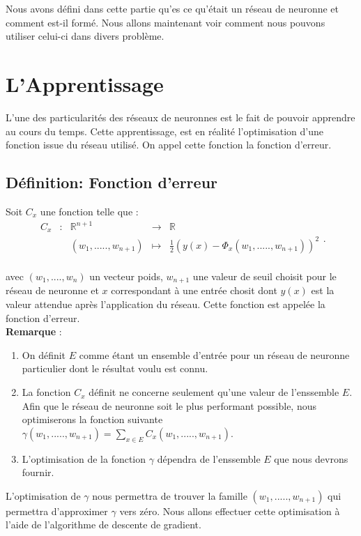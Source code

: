 \documentclass{article}
\newcommand{\fonction}[5]{
	\begin{array}{ccccc}
#1 & : & #2 & \to & #3\\
	& & #4 & \mapsto & #5\\ 
	\end{array}
}
\begin{document}
		
	Nous avons défini dans cette partie qu'es ce qu'était un réseau de neuronne et comment est-il formé. Nous allons maintenant voir comment nous pouvons utiliser celui-ci dans divers problème. 
	
	
\section{L'Apprentissage}	
L'une des particularités des réseaux de neuronnes est le fait de pouvoir apprendre au cours du temps. Cette apprentissage, est en réalité l'optimisation d'une fonction issue du réseau utilisé. On appel cette fonction la fonction d'erreur. \\
 
	\subsection{Définition: Fonction d'erreur}
		Soit $C_{x}$ une fonction telle que :	
		  \[ \fonction{C_{x}}{\mathbb{R}^{n+1}}{\mathbb{R}}{(w_1,.....,w_{n+1})}{\frac{1}{2}(y(x)-\Phi_{x}(w_1,.....,w_{n+1}))^{2}}. \]

		avec $(w_1,....,w_n)$ un vecteur poids, $w_{n+1}$ une valeur de seuil choisit pour le réseau de neuronne et $x$ correspondant à une entrée chosit dont $y(x)$ est la valeur attendue après l'application du réseau. Cette fonction est appelée la fonction d'erreur. \\


 \textbf{Remarque }: 
	\begin{enumerate} 
		\item On définit $E$ comme étant un ensemble d'entrée pour un réseau de neuronne particulier dont le résultat voulu est connu. 
		\item La fonction $C_{x}$ définit ne concerne seulement qu'une valeur de l'enssemble $E$. Afin que le réseau de neuronne soit le plus performant possible, nous optimiserons la fonction suivante $\gamma(w_1,.....,w_{n+1}) = \sum_{x \in E} C_{x}(w_1,.....,w_{n+1})$.
		\item L'optimisation de la fonction $\gamma$ dépendra de l'enssemble $E$ que nous devrons fournir.
	\end{enumerate}

L'optimisation de $\gamma$ nous permettra de trouver la  famille $(w_1,.....,w_{n+1})$ qui permettra d'approximer $\gamma$ vers zéro. Nous allons effectuer cette optimisation à l'aide de l'algorithme de descente de gradient.
\end{document}
